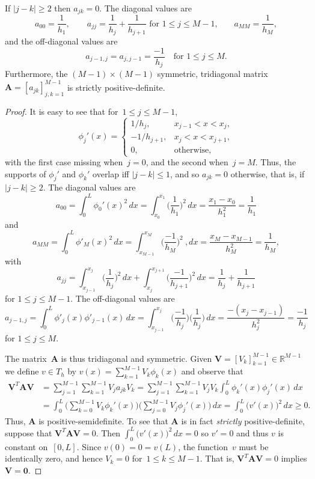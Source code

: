 \begin{theorem}
If $|j-k|\ge2$ then $a_{jk}=0$.  The diagonal values are
\[
a_{00}=\frac{1}{h_1},\qquad
\text{$a_{jj}=\frac{1}{h_j}+\frac{1}{h_{j+1}}$ for $1\le j\le M-1$,}\qquad
a_{MM}=\frac{1}{h_M},
\]
and the off-diagonal values are
\[
a_{j-1,j}=a_{j,j-1}=\frac{-1}{h_j}\quad\text{for $1\le j\le M$.}
\]
Furthermore, the $(M-1)\times(M-1)$ symmetric, tridiagonal 
matrix~$\boldsymbol{A}=[a_{jk}]_{j, k=1}^{M-1}$ is strictly positive-definite.
\end{theorem}
\begin{proof}
It is easy to see that for~$1\le j\le M-1$,
\[
\phi_j'(x)=\begin{cases}
1/h_j,&x_{j-1}<x<x_j,\\
-1/h_{j+1},&x_j<x<x_{j+1},\\
0,&\text{otherwise,}
\end{cases}
\]
with the first case missing when~$j=0$, and the second when~$j=M$.  Thus,
the supports of $\phi_j'$ and $\phi_k'$ overlap iff $|j-k|\le1$, and so 
$a_{jk}=0$ otherwise, that is, if $|j-k|\ge2$.  The diagonal 
values are
\[
a_{00}=\int_0^L\phi_0'(x)^2\,dx
    =\int_{x_0}^{x_1}\biggl(\frac{1}{h_1}\biggr)^2\,dx
    =\frac{x_1-x_0}{h_1^2}=\frac{1}{h_1}
\]
and
\[
a_{MM}=\int_0^L\phi'_M(x)^2\,dx
    =\int_{x_{M-1}}^{x_M}\biggl(\frac{-1}{h_M}\biggr)^2\ , dx
    =\frac{x_M-x_{M-1}}{h_M^2}=\frac{1}{h_M},
\]
with
\[
a_{jj}=\int_{x_{j-1}}^{x_j}\biggl(\frac{1}{h_j}\biggr)^2\,dx
      +\int_{x_j}^{x_{j+1}}\biggl(\frac{-1}{h_{j+1}}\biggr)^2\,dx
        =\frac{1}{h_j}+\frac{1}{h_{j+1}}
\]
for $1\le j\le M-1$.  The off-diagonal values are
\[
a_{j-1,j}=\int_0^L\phi'_j(x)\phi'_{j-1}(x)\,dx
    =\int_{x_{j-1}}^{x_j}\biggl(\frac{-1}{h_j}\biggr)
    \biggl(\frac{1}{h_j}\biggr)\,dx=\frac{-(x_j-x_{j-1})}{h_j^2}=\frac{-1}{h_j}
\]
for $1\le j\le M$. 

The matrix~$\boldsymbol{A}$ is thus tridiagonal and symmetric.  Given
$\boldsymbol{V}=[V_k]_{k=1}^{M-1}\in\mathbb{R}^{M-1}$
we define $v\in T_h$ by $v(x)=\sum_{k=1}^{M-1}V_k\phi_k(x)$ and observe that
\begin{align*}
\boldsymbol{V}^T\boldsymbol{A}\boldsymbol{V}
    &=\sum_{j=1}^{M-1}\sum_{k=1}^{M-1}V_ja_{jk}V_k
    =\sum_{j=1}^{M-1}\sum_{k=1}^{M-1}V_jV_k\int_0^L\phi_k'(x)\phi_j'(x)\,dx\\
    &=\int_0^L\biggl(\sum_{k=0}^{M-1}V_k\phi_k'(x)\biggr)
             \biggl(\sum_{j=0}^{M-1}V_j\phi_j'(x)\biggr)\,dx
    =\int_0^L\bigl(v'(x)\bigr)^2\,dx\ge0.
\end{align*}
Thus, $\boldsymbol{A}$ is positive-semidefinite.  To see that
$\boldsymbol{A}$ is in fact \emph{strictly} positive-definite, suppose that
$\boldsymbol{V}^T\boldsymbol{A}\boldsymbol{V}=0$. Then 
$\int_0^L\bigl(v'(x)\bigr)^2\,dx=0$ so $v'=0$ and thus $v$ is constant 
on~$[0,L]$. Since $v(0)=0=v(L)$, the function~$v$ must be identically zero, 
and hence $V_k=0$ for~$1\le k\le M-1$.   That is, 
$\boldsymbol{V}^T\boldsymbol{A}\boldsymbol{V}=0$ implies 
$\boldsymbol{V}=\boldsymbol{0}$.
\end{proof}

